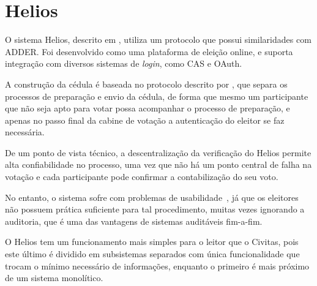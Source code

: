 \section{Helios}

O sistema Helios, descrito em \textcite{adida2008helios}, utiliza um protocolo
que possui similaridades com ADDER. Foi desenvolvido como uma plataforma de
eleição online, e suporta integração com diversos sistemas de \textit{login},
como CAS e OAuth.

A construção da cédula é baseada no protocolo descrito por
\textcite{benaloh2006simple}, que separa os processos de preparação e envio da
cédula, de forma que mesmo um participante que não seja apto para votar possa
acompanhar o processo de preparação, e apenas no passo final da cabine de
votação a autenticação do eleitor se faz necessária.

De um ponto de vista técnico, a descentralização da verificação do Helios
permite alta confiabilidade no processo, uma vez que não há um ponto central de
falha na votação e cada participante pode confirmar a contabilização do seu
voto.

No entanto, o sistema sofre com problemas de
usabilidade~\cite{karayumak2011usability}, já que os eleitores não possuem
prática suficiente para tal procedimento, muitas vezes ignorando a auditoria,
que é uma das vantagens de sistemas auditáveis fim-a-fim.

O Helios tem um funcionamento mais simples para o leitor que o Civitas, pois
este último é dividido em subsistemas separados com única funcionalidade que
trocam o mínimo necessário de informações, enquanto o primeiro é mais próximo
de um sistema monolítico.
